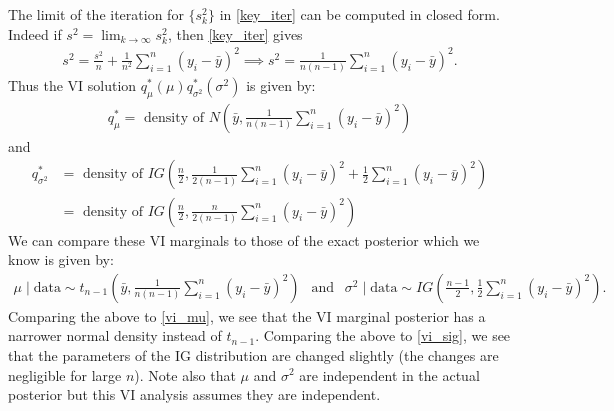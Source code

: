 \documentclass{scrartcl}
\begin{document}
The limit of the iteration for $\{s_k^2\}$ in
\eqref{key_iter} can be computed in closed form. Indeed if $s^2 =
\lim_{k \rightarrow \infty} s_k^2$, then \eqref{key_iter} gives
\begin{align*}
  s^2 = \frac{s^2}{n} + \frac{1}{n^2} \sum_{i=1}^n (y_i -
      \bar{y})^2 \implies s^2 = \frac{1}{n(n-1)} \sum_{i=1}^n (y_i -
      \bar{y})^2. 
\end{align*}
Thus the VI solution $q^*_{\mu}(\mu) q^*_{\sigma^2}(\sigma^2)$ is
given by: 
\begin{align}\label{vi_mu}
  q_{\mu}^* = \text{ density of } N \left(\bar{y}, \frac{1}{n(n-1)}
  \sum_{i=1}^n (y_i - \bar{y})^2 \right)
\end{align}
and
\begin{align}
  q_{\sigma^2}^* &= \text{ density of } IG\left(\frac{n}{2},
  \frac{1}{2(n-1)} \sum_{i=1}^n (y_i - \bar{y})^2 + \frac{1}{2}
  \sum_{i=1}^n (y_i - \bar{y})^2 \right) \nonumber \\
  &= \text{ density of } IG\left(\frac{n}{2},
  \frac{n}{2(n-1)} \sum_{i=1}^n (y_i - \bar{y})^2 \right) \label{vi_sig}
\end{align}
We can compare these VI marginals to those of the exact posterior
which we know is given by:
\begin{align*}
  \mu \mid \text{data} \sim t_{n-1} \left(\bar{y}, \frac{1}{n(n-1)}
  \sum_{i=1}^n (y_i - \bar{y})^2 \right) ~~ \text{ and } ~~ \sigma^2
  \mid \text{data} \sim IG \left(\frac{n-1}{2}, \frac{1}{2}
  \sum_{i=1}^n (y_i - \bar{y})^2 \right). 
\end{align*}
Comparing the above to \eqref{vi_mu}, we see that the VI marginal
posterior has a narrower normal density instead of
$t_{n-1}$. Comparing the above to \eqref{vi_sig}, we see that the
parameters of the IG distribution are changed slightly (the changes
are negligible for large $n$). Note also that $\mu$ and $\sigma^2$ are
independent in the actual posterior but this VI analysis assumes
they are independent. 
\end{document}
